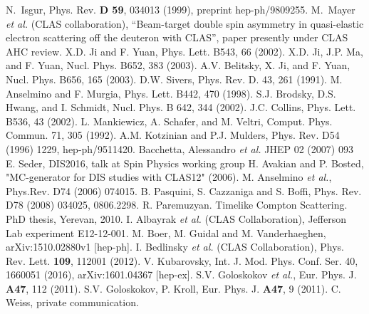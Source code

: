 \documentclass[a4paper,12pt]{report}
\begin{document}
\begin{thebibliography}{99}
  N.~Isgur,
  Phys. Rev. {\bf D 59}, 034013 (1999), 
 preprint hep-ph/9809255.
 M.~Mayer {\it et al.} (CLAS collaboration), ``Beam-target double spin asymmetry in quasi-elastic electron scattering off the deuteron with CLAS'',  paper presently under CLAS AHC review.
 X.D. Ji and F. Yuan, Phys. Lett. B543, 66 (2002).
 X.D. Ji, J.P. Ma, and F. Yuan, Nucl. Phys. B652, 383  (2003). 
 A.V. Belitsky, X. Ji, and F. Yuan, Nucl. Phys. B656, 165 (2003).
 D.W. Sivers, Phys. Rev. D. 43, 261 (1991). 
 M. Anselmino and F. Murgia, Phys. Lett. B442, 470 (1998). 
 S.J. Brodsky, D.S. Hwang, and I. Schmidt, Nucl. Phys. B 642, 344 (2002). 
 J.C. Collins, Phys. Lett. B536, 43 (2002). 
 L. Mankiewicz, A. Schafer, and M. Veltri,
 Comput. Phys. Commun. 71, 305 (1992).
 A.M. Kotzinian and P.J. Mulders, Phys. Rev. D54 (1996) 1229, hep-ph/9511420.
Bacchetta, Alessandro \textit{et al.} JHEP 02 (2007) 093
E. Seder, DIS2016, talk at Spin Physics working group
 H. Avakian and P. Bosted, "MC-generator for DIS studies with CLAS12" (2006).
M. Anselmino \textit{et al.}, Phys.Rev. D74 (2006) 074015. 
B. Pasquini, S. Cazzaniga and S. Boffi, Phys. Rev. D78 (2008) 034025, 0806.2298.
 R. Paremuzyan. Timelike Compton Scattering. PhD thesis, Yerevan, 2010.
 I. Albayrak {\it et al.} (CLAS Collaboration), Jefferson Lab experiment E12-12-001. 
 M. Boer, M. Guidal and M. Vanderhaeghen, arXiv:1510.02880v1 [hep-ph]. 
 I. Bedlinsky {\it et al.} (CLAS Collaboration), Phys. Rev. Lett. {\bf 109}, 112001 (2012). 
 V. Kubarovsky, Int. J. Mod. Phys. Conf. Ser. 40, 1660051 (2016), arXiv:1601.04367 [hep-ex]. 
 S.V. Goloskokov {\it et al.}, Eur. Phys. J. {\bf A47}, 112 (2011). 
 S.V. Goloskokov, P. Kroll, Eur. Phys. J. {\bf A47}, 9 (2011).  
 C. Weiss, private communication.
\end{thebibliography}

%
\end{document}
